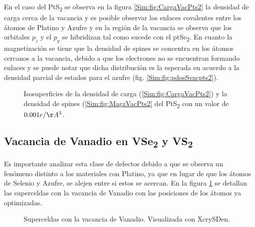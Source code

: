  En el caso del PtS\textsubscript{2}  se observa en la figura \ref{Sim:fig:CargaVacPts2}  la densidad de carga  cerca de la vacancia y es posible observar los enlaces covalentes entre los \'atomos de Platino y Azufre y en la regi\'on de la vacancia se observa que los orbitales $p_z$ y el $p_y$ se hibridizan tal como sucede con el  ptSe\textsubscript{2}. En cuanto la magnetizaci\'on se    tiene que la densidad de spines se concentra en los \'atomos cercanos a la vacancia, debido a que los electrones no se encuentran formando enlaces y se puede notar que dicha distribuci\'on es la esperada en acuerdo a la densidad parcial de estados para el azufre (fig. \ref{Sim:fig:pdosSvacpts2}).
 \begin{figure}[!hbt]
 	\centering
 	\caption[Iso superficies de la densidad de carga y de spin en el PtS\textsubscript{2} con vacancia de Platino.]{Isosuperficies de la densidad de carga (\ref{Sim:fig:CargaVacPts2}) y la densidad de spines (\ref{Sim:fig:MagzVacPts2} del PtS\textsubscript{2} con un valor de $0.001 e/\AA^3$. }
 \end{figure}     
\subsection{Vacancia de Vanadio en VSe\textsubscript{2} y VS\textsubscript{2}} \label{Sim:subsec:vacV}
Es importante analizar esta clase de defectos debido a que se observa un fen\'omeno distinto a los materiales con Platino, ya que en lugar de que los \'atomos de Selenio y Azufre, se alejen entre  si estos se acercan. En la figura \ref{Sim:fig:vacV} se detallan las superceldas con la vacancia de Vanadio con las posiciones de los \'atomos ya optimizadas.
\newline
\begin{figure}[!hbt]
	\centering
  \caption[Superceldas de VSe\textsubscript{2} y VS\textsubscript{2} con vacancia de vanadio.]{Superceldas con la vacancia de Vanadio. Visualizada con XcrySDen.}
  \label{Sim:fig:vacV}
\end{figure}

